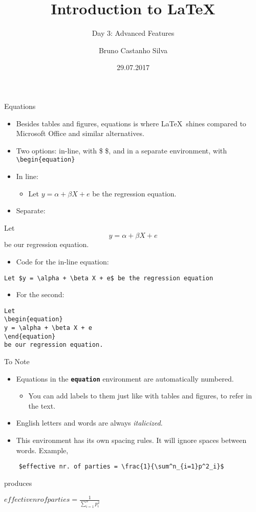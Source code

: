\documentclass{beamer}
\title{Introduction to \LaTeX}
\author{Bruno Castanho Silva}
\date{29.07.2017}
\subtitle{Day 3: Advanced Features}
\newcommand{\bftt}[1]{\textbf{\texttt{#1}}}
\newcommand{\cmd}[1]{{\color[HTML]{008000}\bftt{#1}}}
\begin{document}
	
\begin{frame}
		\titlepage
\end{frame}

\begin{frame}[fragile]{Equations}
	\begin{itemize}
		\item Besides tables and figures, equations is where \LaTeX~shines compared to Microsoft Office and similar alternatives.
		\item Two options: in-line, with \$ \$, and in a separate environment, with \verb|\begin{equation}|
		\item In line:
		\begin{itemize}
			\item  Let $y = \alpha + \beta X + e$ be the regression equation.
		\end{itemize}
		\item Separate:
	\end{itemize}
	Let
	\begin{equation}
	y = \alpha + \beta X + e
	\end{equation}
	be our regression equation.
\end{frame}
	
\begin{frame}[fragile]
	\begin{itemize}
		\item Code for the in-line equation:
	\end{itemize}
	\verb|Let $y = \alpha + \beta X + e$ be the regression equation|
	\begin{itemize}
	\item For the second:
	\end{itemize}
	\begin{verbatim}
Let
\begin{equation}
y = \alpha + \beta X + e
\end{equation}
be our regression equation.
	\end{verbatim}	
\end{frame}	

\begin{frame}[fragile]{To Note}
	\begin{itemize}
		\item Equations in the \cmd{equation} environment are automatically numbered.
		\begin{itemize}
			\item You can add labels to them just like with tables and figures, to refer in the text.
		\end{itemize}
		\item English letters and words are always \textit{italicized}.
		\item This environment has its own spacing rules. It will ignore spaces between words. Example, 
	\end{itemize}
	\begin{verbatim} 
	$effective nr. of parties = \frac{1}{\sum^n_{i=1}p^2_i}$
	\end{verbatim} 
	produces
	\medskip
	
	$effective nr of parties = \frac{1}{\sum^n_{i=1}p^2_i}$
\end{frame} 
\end{document}
